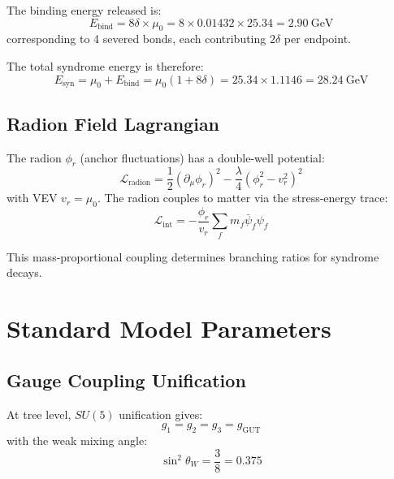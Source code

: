 \documentclass[11pt,a4paper]{article}
\theoremstyle{definition}
\newcommand{\dgeo}{\delta}              %
\newcommand{\murad}{\mu_0}              %
\newcommand{\Esyn}{E_{\text{syn}}}      %
\newcommand{\LL}{\mathcal{L}}           %
\begin{document}
The binding energy released is:
\begin{equation}
E_{\text{bind}} = 8\dgeo \times \murad = 8 \times 0.01432 \times 25.34 = 2.90~\text{GeV}
\end{equation}
corresponding to 4 severed bonds, each contributing $2\dgeo$ per endpoint.

The total syndrome energy is therefore:
\begin{equation}
\Esyn = \murad + E_{\text{bind}} = \murad(1 + 8\dgeo) = 25.34 \times 1.1146 = 28.24~\text{GeV}
\end{equation}

\subsection{Radion Field Lagrangian}

The radion $\phi_r$ (anchor fluctuations) has a double-well potential:
\begin{equation}
\LL_{\text{radion}} = \frac{1}{2}(\partial_\mu \phi_r)^2 - \frac{\lambda}{4}(\phi_r^2 - v_r^2)^2
\end{equation}
with VEV $v_r = \murad$. The radion couples to matter via the stress-energy trace:
\begin{equation}
\LL_{\text{int}} = -\frac{\phi_r}{v_r} \sum_f m_f \bar{\psi}_f \psi_f
\end{equation}

This mass-proportional coupling determines branching ratios for syndrome decays.

\section{Standard Model Parameters}
\label{sec:sm}

\subsection{Gauge Coupling Unification}

At tree level, $SU(5)$ unification gives:
\begin{equation}
g_1 = g_2 = g_3 = g_{\text{GUT}}
\end{equation}
with the weak mixing angle:
\begin{equation}
\sin^2\theta_W = \frac{3}{8} = 0.375
\end{equation}
\end{document}
